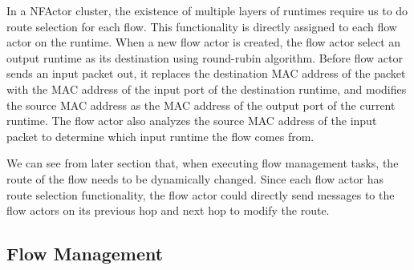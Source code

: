 In a NFActor cluster, the existence of multiple layers of runtimes require us to do route selection for each flow. This functionality is directly assigned to each flow actor on the runtime. When a new flow actor is created, the flow actor select an output runtime as its destination using round-rubin algorithm. Before flow actor sends an input packet out, it replaces the destination MAC address of the packet with the MAC address of the input port of the destination runtime, and modifies the source MAC address as the MAC address of the output port of the current runtime. The flow actor also analyzes the source MAC address of the input packet to determine which input runtime the flow comes from.

We can see from later section that, when executing flow management tasks, the route of the flow needs to be dynamically changed. Since each flow actor has route selection functionality, the flow actor could directly send messages to the flow actors on its previous hop and next hop to modify the route.



\subsection{Flow Management}


